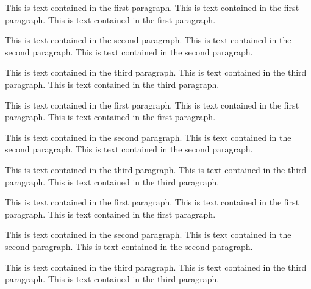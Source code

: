     {
    \raggedleft
    This is text contained in the first paragraph.
    This is text contained in the first paragraph.
    This is text contained in the first paragraph.
    \par    %
    This is text contained in the second paragraph.
    This is text contained in the second paragraph.
    This is text contained in the second paragraph.

    This is text contained in the third paragraph.
    This is text contained in the third paragraph.
    This is text contained in the third paragraph.  
    \\
    }
    {
    \vspace{10pt}
    \raggedright
    This is text contained in the first paragraph.
    This is text contained in the first paragraph.
    This is text contained in the first paragraph.
    \par    %
    This is text contained in the second paragraph.
    This is text contained in the second paragraph.
    This is text contained in the second paragraph.

    This is text contained in the third paragraph.
    This is text contained in the third paragraph.
    This is text contained in the third paragraph.   
    \\
    }
    {
    \vspace{10pt}
    \centering
    This is text contained in the first paragraph.
    This is text contained in the first paragraph.
    This is text contained in the first paragraph.
    \par    %
    This is text contained in the second paragraph.
    This is text contained in the second paragraph.
    This is text contained in the second paragraph.

    This is text contained in the third paragraph.
    This is text contained in the third paragraph.
    This is text contained in the third paragraph.   
    \\
    }

